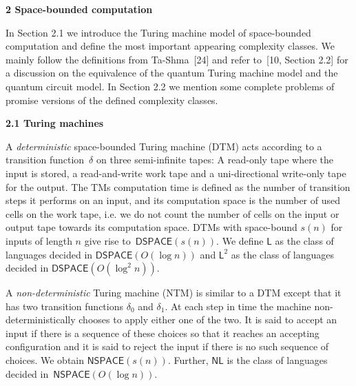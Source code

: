 \documentclass[10pt,a4paper]{article}
\begin{document}
\par\medskip\noindent\textbf{
2 Space-bounded computation}\par




In Section 2.1 we introduce the Turing machine model of space-bounded computation and define the most important appearing complexity classes.
We mainly follow the definitions from Ta-Shma [24] and refer to [10, Section 2.2] for a discussion on the equivalence of the quantum Turing machine model and the quantum circuit model.
In Section 2.2 we mention some complete problems of promise versions of the defined complexity classes.\par




\par\medskip\noindent\textbf{
2.1 Turing machines}\par




A \emph{deterministic} space-bounded Turing machine (DTM) acts according to a transition function $\delta$ on three semi-infinite tapes: A read-only tape where the input is stored, a read-and-write work tape and a uni-directional write-only tape for the output.
The TMs computation time is defined as the number of transition steps it performs on an input, and its computation space is the number of used cells on the work tape, i.e. we do not count the number of cells on the input or output tape towards its computation space.
DTMs with space-bound $s(n)$ for inputs of length $n$ give rise to $\mathsf{DSPACE}(s(n))$.
We define $\mathsf{L}$ as the class of languages decided in $\mathsf{DSPACE}(O(\log n))$ and $\mathsf{L}^{2}$ as the class of languages decided in $\mathsf{DSPACE}(O(\log^{2}n))$.\par




A \emph{non-deterministic} Turing machine (NTM) is similar to a DTM except that it has two transition functions $\delta_{0}$ and $\delta_{1}$. At each step in time the machine non-deterministically chooses to apply either one of the two.
It is said to accept an input if there is a sequence of these choices so that it reaches an accepting configuration and it is said to reject the input if there is no such sequence of choices.
We obtain $\mathsf{NSPACE}(s(n))$. Further, $\mathsf{NL}$ is the class of languages decided in $\mathsf{NSPACE}(O(\log n))$.\par
\end{document}
